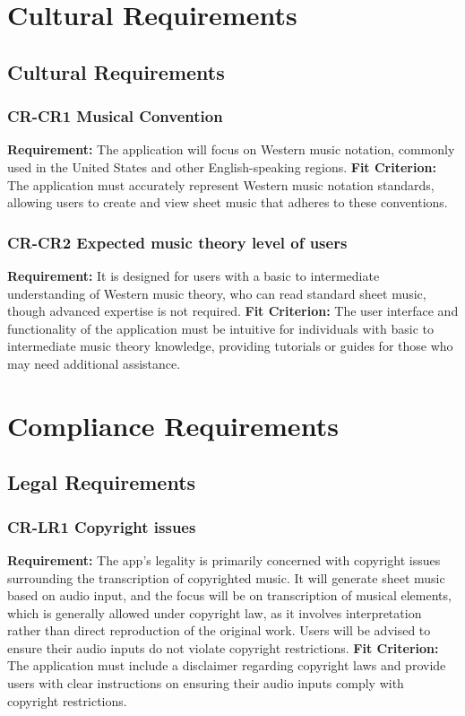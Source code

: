 \documentclass[12pt]{article}
\begin{document}
\section{Cultural Requirements}
\subsection{Cultural Requirements}

\subsubsection*{CR-CR1 Musical Convention}
\textbf{Requirement: }The application will focus on Western music notation, commonly used in the United States and other English-speaking regions. 
\textbf{Fit Criterion:} The application must accurately represent Western music notation standards, allowing users to create and view sheet music that adheres to these conventions.

\subsubsection*{CR-CR2 Expected music theory level of users}
\textbf{Requirement: }It is designed for users with a basic to intermediate understanding of Western music theory, who can read standard sheet music, though advanced expertise is not required.
\textbf{Fit Criterion:} The user interface and functionality of the application must be intuitive for individuals with basic to intermediate music theory knowledge, providing tutorials or guides for those who may need additional assistance.

\section{Compliance Requirements}
\subsection{Legal Requirements}

\subsubsection*{CR-LR1 Copyright issues}
\textbf{Requirement: }The app’s legality is primarily concerned with copyright issues surrounding the transcription of copyrighted music. It will generate sheet music based on audio input, and the focus will be on transcription of musical elements, which is generally allowed under copyright law, as it involves interpretation rather than direct reproduction of the original work. Users will be advised to ensure their audio inputs do not violate copyright restrictions.
\textbf{Fit Criterion:} The application must include a disclaimer regarding copyright laws and provide users with clear instructions on ensuring their audio inputs comply with copyright restrictions.
\end{document}
